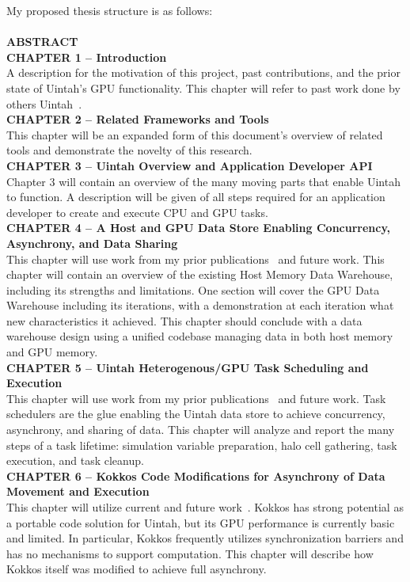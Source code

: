 \documentclass[12pt]{article}
\begin{document}
My proposed thesis structure is as follows:\\
\\
\textbf{ABSTRACT}\\
\textbf{CHAPTER 1 – Introduction}\\
A description for the motivation of this project, past contributions, and the prior state of Uintah's GPU functionality. This chapter will refer to past work done by others Uintah~\cite{wolfhpc12, meng-dissertation}.\\  
\textbf{CHAPTER 2 – Related Frameworks and Tools}\\
This chapter will be an expanded form of this document's overview of related tools and demonstrate the novelty of this research.\\  
\textbf{CHAPTER 3 – Uintah Overview and Application Developer API}\\
Chapter 3 will contain an overview of the many moving parts that enable Uintah to function.  A description will be given of all steps required for an application developer to create and execute CPU and GPU tasks.  \\  
\textbf{CHAPTER 4 -- A Host and GPU Data Store Enabling Concurrency, Asynchrony, and Data Sharing}\\ 
This chapter will use work from my prior publications~\cite{wolfhpc15,ijpp16,espm2-brad} and future work.  This chapter will contain an overview of the existing Host Memory Data Warehouse, including its strengths and limitations.  One section will cover the GPU Data Warehouse including its iterations, with a demonstration at each iteration what new characteristics it achieved.  This chapter should conclude with a data warehouse design using a unified codebase managing data in both host memory and GPU memory.\\  
\textbf{CHAPTER 5 – Uintah Heterogenous/GPU Task Scheduling and Execution}\\
This chapter will use work from my prior publications~\cite{wolfhpc15,ijpp16,espm2-brad} and future work.  
Task schedulers are the glue enabling the Uintah data store to achieve concurrency, asynchrony, and sharing of data.  This chapter will analyze and report the many steps of a task lifetime: simulation variable preparation, halo cell gathering, task execution, and task cleanup.\\ 
\textbf{CHAPTER 6 – Kokkos Code Modifications for Asynchrony of Data Movement and Execution}\\
This chapter will utilize current and future work~\cite{espm2-16,jocs18}.  Kokkos has strong potential as a portable code solution for Uintah, but its GPU performance is currently basic and limited.  In particular, Kokkos frequently utilizes synchronization barriers and has no mechanisms to support computation. This chapter will describe how Kokkos itself was modified to achieve full asynchrony.\\
\end{document}
